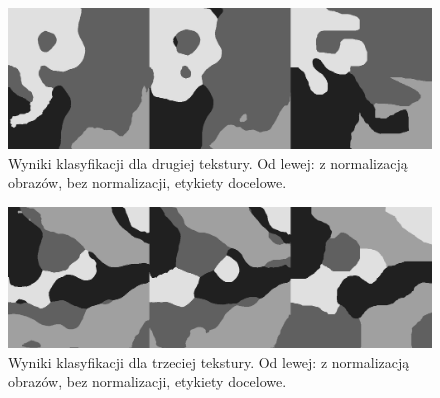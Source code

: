 \documentclass{classrep}
\begin{document}
\begin{figure}[h!]
	\centering
  	\includegraphics[width=\linewidth]{2.png}
	\caption{Wyniki klasyfikacji dla drugiej tekstury. Od lewej: z normalizacją obrazów, bez normalizacji, etykiety docelowe.}
	\label{fig:widma}
\end{figure}

\begin{figure}[h!]
	\centering
  	\includegraphics[width=\linewidth]{3.png}
	\caption{Wyniki klasyfikacji dla trzeciej tekstury. Od lewej: z normalizacją obrazów, bez normalizacji, etykiety docelowe.}
	\label{fig:widma}
\end{figure}
\end{document}
